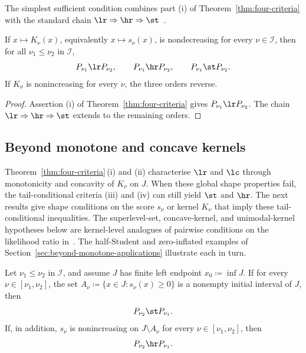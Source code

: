\documentclass[11pt]{article}
\begin{document}
The simplest sufficient condition combines part \textup{(i)} of Theorem~\ref{thm:four-criteria} with the standard chain \(\lr\Rightarrow\hr\Rightarrow\st\)~\cite[Theorem 1.C.1]{ShakedShanthikumar}.

\begin{cor}
\label{cor:monotone-kernel}
If \(x\mapsto K_\nu(x)\), equivalently \(x\mapsto s_\nu(x)\), is nondecreasing for every \(\nu\in\mathcal I\), then for all \(\nu_1\le\nu_2\) in \(\mathcal I\),
\[
P_{\nu_1}\lr P_{\nu_2},\qquad
P_{\nu_1}\hr P_{\nu_2},\qquad
P_{\nu_1}\st P_{\nu_2}.
\]
If \(K_\nu\) is nonincreasing for every \(\nu\), the three orders reverse.
\end{cor}

\begin{proof}
Assertion \textup{(i)} of Theorem~\ref{thm:four-criteria} gives \(P_{\nu_1}\lr P_{\nu_2}\). The chain \(\lr\Rightarrow\hr\Rightarrow\st\) extends to the remaining orders.
\end{proof}

\subsection{Beyond monotone and concave kernels}
\label{subsec:beyond-monotone}

Theorem~\ref{thm:four-criteria}\,\textup{(i)} and \textup{(ii)} characterise \(\lr\) and \(\lc\) through monotonicity and concavity of \(K_\nu\) on \(J\). When these global shape properties fail, the tail-conditional criteria \textup{(iii)} and \textup{(iv)} can still yield \(\st\) and \(\hr\). The next results give shape conditions on the score \(s_\nu\) or kernel \(K_\nu\) that imply these tail-conditional inequalities. The superlevel-set, concave-kernel, and unimodal-kernel hypotheses below are kernel-level analogues of pairwise conditions on the likelihood ratio in~\cite{DerbaziPairwise}. The half-Student and zero-inflated examples of Section~\ref{sec:beyond-monotone-applications} illustrate each in turn.

\begin{prop}
\label{prop:kernel-superlevel}
Let \(\nu_1\le\nu_2\) in \(\mathcal I\), and assume \(J\) has finite left endpoint \(x_0\coloneqq \inf J\). If for every \(\nu\in[\nu_1,\nu_2]\), the set \(A_\nu\coloneqq \{x\in J:s_\nu(x)\ge 0\}\) is a nonempty initial interval of \(J\), then
\[
P_{\nu_2}\st P_{\nu_1}.
\]
If, in addition, \(s_\nu\) is nonincreasing on \(J\setminus A_\nu\) for every \(\nu\in[\nu_1,\nu_2]\), then
\[
P_{\nu_2}\hr P_{\nu_1}.
\]
\end{prop}
\end{document}
